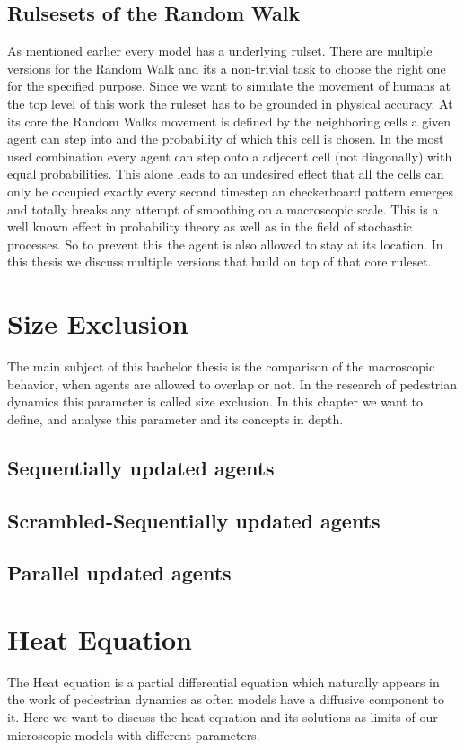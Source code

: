 \subsection{Rulsesets of the Random Walk}
As mentioned earlier every model has a underlying rulset. There are multiple versions for the Random Walk and its a non-trivial task to choose the right one for the specified purpose. 
Since we want to simulate the movement of humans at the top level of this work the ruleset has to be grounded in physical accuracy. 
At its core the Random Walks movement is defined by the neighboring cells a given agent can step into and the probability of which this cell is chosen. 
In the most used combination every agent can step onto a adjecent cell (not diagonally) with equal probabilities.
This alone leads to an undesired effect that all the cells can only be occupied exactly every second timestep an checkerboard pattern emerges and totally breaks any attempt of smoothing on a macroscopic scale. 
This is a well known effect in probability theory as well as in the field of stochastic processes.
So to prevent this the agent is also allowed to stay at its location. 
In this thesis we discuss multiple versions that build on top of that core ruleset. 


\newpage
\section{Size Exclusion}
The main subject of this bachelor thesis is the comparison of the macroscopic behavior, when agents are allowed to overlap or not.
In the research of pedestrian dynamics this parameter is called size exclusion. In this chapter we want to define, and analyse this parameter and its concepts in depth. 
\subsection{Sequentially updated agents}
\subsection{Scrambled-Sequentially updated agents}
\subsection{Parallel updated agents}

\newpage
\section{Heat Equation}
The Heat equation is a partial differential equation which naturally appears in the work of pedestrian dynamics as often models have a diffusive component to it.
Here we want to discuss the heat equation and its solutions as limits of our microscopic models with different parameters.

